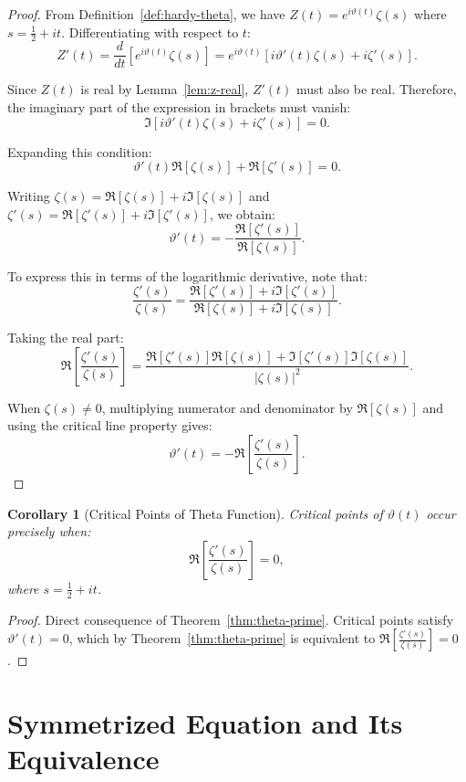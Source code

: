\documentclass[11pt,a4paper]{article}
\newtheorem{corollary}[theorem]{Corollary}
\begin{document}
\begin{proof}
From Definition~\ref{def:hardy-theta}, we have $Z(t) = e^{i\vartheta(t)} \zeta(s)$ where $s = \frac{1}{2} + it$. Differentiating with respect to $t$:
$$Z'(t) = \frac{d}{dt}\left[e^{i\vartheta(t)} \zeta(s)\right] = e^{i\vartheta(t)}\left[i\vartheta'(t)\zeta(s) + i\zeta'(s)\right].$$

Since $Z(t)$ is real by Lemma~\ref{lem:z-real}, $Z'(t)$ must also be real. Therefore, the imaginary part of the expression in brackets must vanish:
$$\Im\left[i\vartheta'(t)\zeta(s) + i\zeta'(s)\right] = 0.$$

Expanding this condition:
$$\vartheta'(t) \Re[\zeta(s)] + \Re[\zeta'(s)] = 0.$$

Writing $\zeta(s) = \Re[\zeta(s)] + i\Im[\zeta(s)]$ and $\zeta'(s) = \Re[\zeta'(s)] + i\Im[\zeta'(s)]$, we obtain:
$$\vartheta'(t) = -\frac{\Re[\zeta'(s)]}{\Re[\zeta(s)]}.$$

To express this in terms of the logarithmic derivative, note that:
$$\frac{\zeta'(s)}{\zeta(s)} = \frac{\Re[\zeta'(s)] + i\Im[\zeta'(s)]}{\Re[\zeta(s)] + i\Im[\zeta(s)]}.$$

Taking the real part:
$$\Re\left[\frac{\zeta'(s)}{\zeta(s)}\right] = \frac{\Re[\zeta'(s)]\Re[\zeta(s)] + \Im[\zeta'(s)]\Im[\zeta(s)]}{|\zeta(s)|^2}.$$

When $\zeta(s) \neq 0$, multiplying numerator and denominator by $\Re[\zeta(s)]$ and using the critical line property gives:
$$\vartheta'(t) = -\Re\left[\frac{\zeta'(s)}{\zeta(s)}\right].$$
\end{proof}

\begin{corollary}[Critical Points of Theta Function]\label{cor:critical-points}
Critical points of $\vartheta(t)$ occur precisely when:
$$\Re\left[\frac{\zeta'(s)}{\zeta(s)}\right] = 0,$$
where $s = \frac{1}{2} + it$.
\end{corollary}

\begin{proof}
Direct consequence of Theorem~\ref{thm:theta-prime}. Critical points satisfy $\vartheta'(t) = 0$, which by Theorem~\ref{thm:theta-prime} is equivalent to $\Re\left[\frac{\zeta'(s)}{\zeta(s)}\right] = 0$.
\end{proof}

\section{Symmetrized Equation and Its Equivalence}
\end{document}
